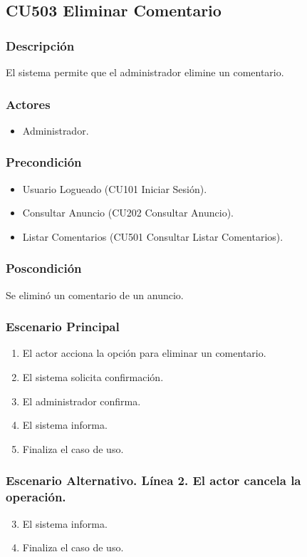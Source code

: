 \subsection{CU503 Eliminar Comentario}
\subsubsection{Descripci\'{o}n}
El sistema permite que el administrador elimine un comentario.
\subsubsection{Actores}
\begin{itemize}
\item Administrador.
\end{itemize}
\subsubsection{Precondici\'{o}n}
\begin{itemize}
\item Usuario Logueado (CU101 Iniciar Sesi\'{o}n).
\item Consultar Anuncio (CU202 Consultar Anuncio).
\item Listar Comentarios (CU501 Consultar Listar Comentarios).
\end{itemize}
\subsubsection{Poscondici\'{o}n}
Se elimin\'{o} un comentario de un anuncio.
\subsubsection{Escenario Principal}
\begin{enumerate}
\item El actor acciona la opci\'{o}n para eliminar un comentario.
\item El sistema solicita confirmaci\'{o}n.
\item El administrador confirma.
\item El sistema informa.
\item Finaliza el caso de uso.
\end{enumerate}
\subsubsection{Escenario Alternativo. L\'{i}nea 2. El actor cancela la operaci\'{o}n.}
\begin{enumerate}
\setcounter{enumi}{2}
\item El sistema informa.
\item Finaliza el caso de uso.
\end{enumerate}
